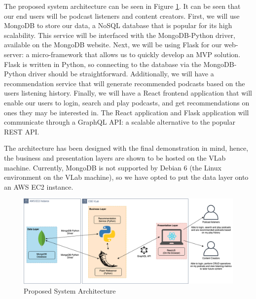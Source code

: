 \documentclass[12pt]{article}
\begin{document}
The proposed system architecture can be seen in Figure \ref{fig:SysArch}.
It can be seen that our end users will be podcast listeners and content creators.
First, we will use MongoDB\cite{MongoDB2020} to store our data, a NoSQL database that is popular for its high scalability.
This service will be interfaced with the MongoDB-Python driver, available on the MongoDB website\cite{MongoDB2020}.
Next, we will be using Flask\cite{flask} for our web-server: a micro-framework that allows us to quickly develop an MVP solution.
Flask is written in Python, so connecting to the database via the MongoDB-Python driver should be straightforward.
Additionally, we will have a recommendation service that will generate recommended podcasts based on the users listening history.
Finally, we will have a React\cite{react} frontend application that will enable our users to login, search and play podcasts, and get recommendations on ones they may be interested in.
The React application and Flask application will communicate through a GraphQL API: a scalable alternative to the popular REST API\cite{graphql}.

The architecture has been designed with the final demonstration in mind, hence, the business and presentation layers are shown to be hosted on the VLab machine.
Currently, MongoDB is not supported by Debian 6 (the Linux environment on the VLab machine), so we have opted to put the data layer onto an AWS EC2 instance\cite{aws_ec2}.

\begin{figure}[ht]
    \centering
    \includegraphics[width=\textwidth]{resources/SystemArchitecture}
    \caption{Proposed System Architecture}
    \label{fig:SysArch}
\end{figure}

\newpage


\end{document}
